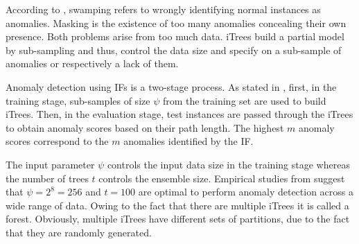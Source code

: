 According to \cite{liu2008isolation}, swamping refers to wrongly identifying normal instances as anomalies. Masking is the existence of too many anomalies concealing their own presence. Both problems arise from too much data. \acp{iTree} build a partial model by sub-sampling and thus, control the data size and specify on a sub-sample of anomalies or respectively a lack of them. 

Anomaly detection using \acp{IF} is a two-stage process. 
As stated in \cite{gruhl2022, liu2008isolation}, first, in the training stage, sub-samples of size $\psi$ from the training set are used to build \acp{iTree}. 
Then, in the evaluation stage, test instances are passed through the \acp{iTree} to obtain anomaly scores based on their path length. 
The highest $m$ anomaly scores correspond to the $m$ anomalies identified by the \ac{IF}. 

The input parameter $\psi$ controls the input data size in the training stage whereas the number of trees $t$ controls the ensemble size. 
Empirical studies from \cite{liu2008isolation} suggest that $\psi = 2^8 = 256$ and $t = 100$ are optimal to perform anomaly detection across a wide range of data.
Owing to the fact that there are multiple \acp{iTree} it is called a forest. 
Obviously, multiple \acp{iTree} have different sets of partitions, due to the fact that they are randomly generated.